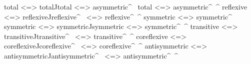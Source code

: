 \begin{code}
total            <=>  total^^
total            <=>  asymmetric^~
total            <=>  asymmetric^~^
reflexive        <=>  reflexive^^
reflexive^~      <=>  reflexive^~^
symmetric        <=>  symmetric^~
symmetric        <=>  symmetric^^
symmetric        <=>  symmetric^~^
transitive       <=>  transitive^^
transitive^~     <=>  transitive^~^
coreflexive      <=>  coreflexive^^
coreflexive^~    <=>  coreflexive^~^
antisymmetric    <=>  antisymmetric^^
antisymmetric^~  <=>  antisymmetric^~^
\end{code}
